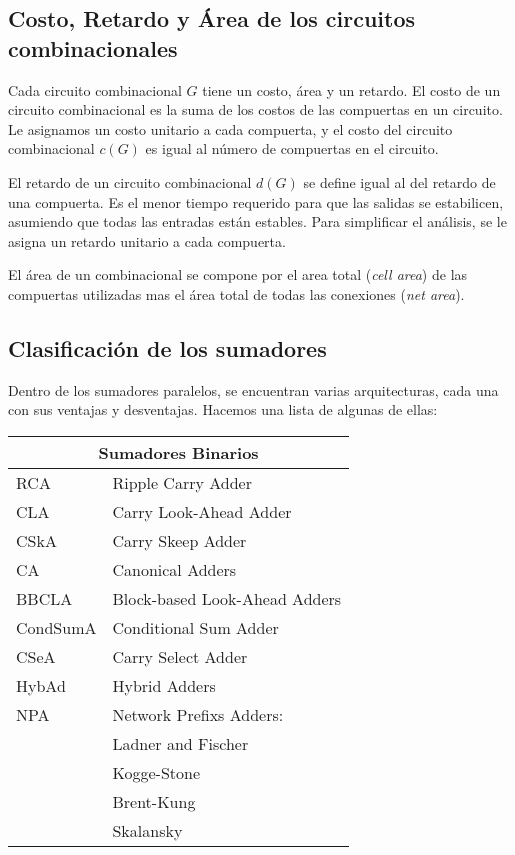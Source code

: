 \subsection{Costo, Retardo y Área de los circuitos combinacionales}
Cada circuito combinacional \(G\) tiene un costo, área y un retardo. El costo de un circuito combinacional es la suma de los costos de las compuertas en un circuito. Le asignamos un costo unitario a cada compuerta, y el costo del circuito combinacional \(c(G)\) es igual al número de compuertas en el circuito.

El retardo de un circuito combinacional \(d(G)\) se define igual al del retardo de una compuerta. Es el menor tiempo requerido para que las salidas se estabilicen, asumiendo que todas las entradas están estables. Para simplificar el análisis, se le asigna un retardo unitario a cada compuerta.

El área de un combinacional se compone por el area total (\emph{cell area}) de las compuertas utilizadas mas el área total de todas las conexiones (\emph{net area}). 

\subsection{Clasificación de los sumadores}

Dentro de los sumadores paralelos, se encuentran varias arquitecturas, cada una con sus ventajas y desventajas. Hacemos una lista de algunas de ellas:

\vspace{0.3cm}

\begin{tabular}{ |l|l| }
  \hline
  \multicolumn{2}{|c|}{Sumadores Binarios} \\
  \hline

RCA & Ripple Carry Adder \\
CLA & Carry Look-Ahead Adder \\
CSkA & Carry Skeep Adder \\
CA & Canonical Adders \\
BBCLA & Block-based Look-Ahead Adders \\
CondSumA & Conditional Sum Adder \\
CSeA & Carry Select Adder \\
HybAd & Hybrid Adders \\
NPA & Network Prefixs Adders: \\
& Ladner and Fischer \\
&Kogge-Stone \\
&Brent-Kung \\
&Skalansky \\
  \hline
\end{tabular}
\vspace{0.3cm}

